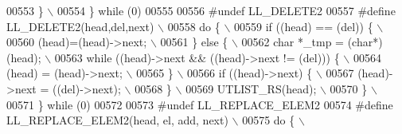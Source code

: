 \begin{DoxyCode}
00553 \textcolor{preprocessor}{  \}                                                                                            \(\backslash\)}
00554 \textcolor{preprocessor}{\} while (0)}
00555 
00556 \textcolor{preprocessor}{#undef LL\_DELETE2}
00557 \textcolor{preprocessor}{#define LL\_DELETE2(head,del,next)                                                              \(\backslash\)}
00558 \textcolor{preprocessor}{do \{                                                                                           \(\backslash\)}
00559 \textcolor{preprocessor}{  if ((head) == (del)) \{                                                                       \(\backslash\)}
00560 \textcolor{preprocessor}{    (head)=(head)->next;                                                                       \(\backslash\)}
00561 \textcolor{preprocessor}{  \} else \{                                                                                     \(\backslash\)}
00562 \textcolor{preprocessor}{    char *\_tmp = (char*)(head);                                                                \(\backslash\)}
00563 \textcolor{preprocessor}{    while ((head)->next && ((head)->next != (del))) \{                                          \(\backslash\)}
00564 \textcolor{preprocessor}{      (head) = (head)->next;                                                                   \(\backslash\)}
00565 \textcolor{preprocessor}{    \}                                                                                          \(\backslash\)}
00566 \textcolor{preprocessor}{    if ((head)->next) \{                                                                        \(\backslash\)}
00567 \textcolor{preprocessor}{      (head)->next = ((del)->next);                                                            \(\backslash\)}
00568 \textcolor{preprocessor}{    \}                                                                                          \(\backslash\)}
00569 \textcolor{preprocessor}{    UTLIST\_RS(head);                                                                           \(\backslash\)}
00570 \textcolor{preprocessor}{  \}                                                                                            \(\backslash\)}
00571 \textcolor{preprocessor}{\} while (0)}
00572 
00573 \textcolor{preprocessor}{#undef LL\_REPLACE\_ELEM2}
00574 \textcolor{preprocessor}{#define LL\_REPLACE\_ELEM2(head, el, add, next)                                                  \(\backslash\)}
00575 \textcolor{preprocessor}{do \{                                                                                           \(\backslash\)}

\end{DoxyCode}
